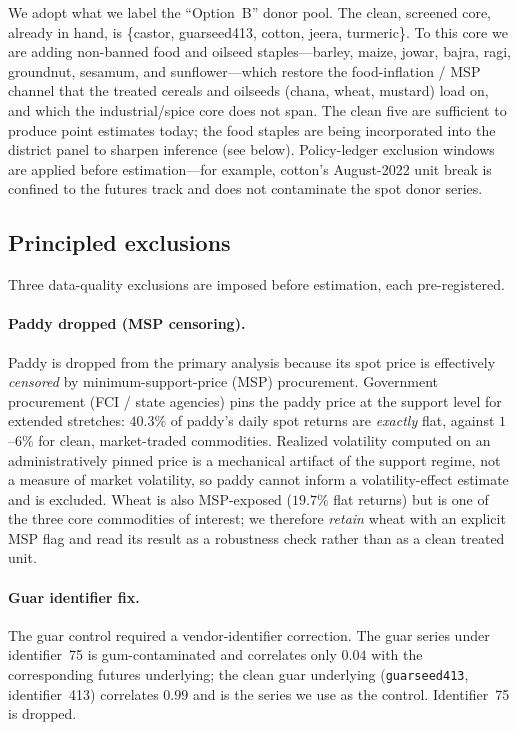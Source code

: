 We adopt what we label the ``Option~B'' donor pool. The clean, screened core, already in hand, is
\{castor, guarseed413, cotton, jeera, turmeric\}. To this core we are adding non-banned food and
oilseed staples---barley, maize, jowar, bajra, ragi, groundnut, sesamum, and sunflower---which
restore the food-inflation / MSP channel that the treated cereals and oilseeds (chana, wheat,
mustard) load on, and which the industrial/spice core does not span. The clean five are sufficient to
produce point estimates today; the food staples are being incorporated into the district panel to
sharpen inference (see below). Policy-ledger exclusion windows are applied before estimation---for
example, cotton's August-2022 unit break is confined to the futures track and does not contaminate
the spot donor series.

\subsection{Principled exclusions}

Three data-quality exclusions are imposed before estimation, each pre-registered.

\paragraph{Paddy dropped (MSP censoring).}
Paddy is dropped from the primary analysis because its spot price is effectively
\emph{censored} by minimum-support-price (MSP) procurement. Government procurement (FCI / state
agencies) pins the paddy price at the support level for extended stretches: $40.3\%$ of paddy's daily
spot returns are \emph{exactly} flat, against $1$--$6\%$ for clean, market-traded commodities.
Realized volatility computed on an administratively pinned price is a mechanical artifact of the
support regime, not a measure of market volatility, so paddy cannot inform a volatility-effect
estimate and is excluded. Wheat is also MSP-exposed ($19.7\%$ flat returns) but is one of the three
core commodities of interest; we therefore \emph{retain} wheat with an explicit MSP flag and read its
result as a robustness check rather than as a clean treated unit.

\paragraph{Guar identifier fix.}
The guar control required a vendor-identifier correction. The guar series under identifier~75 is
gum-contaminated and correlates only $0.04$ with the corresponding futures underlying; the clean guar
underlying (\texttt{guarseed413}, identifier~413) correlates $0.99$ and is the series we use as the
control. Identifier~75 is dropped.

